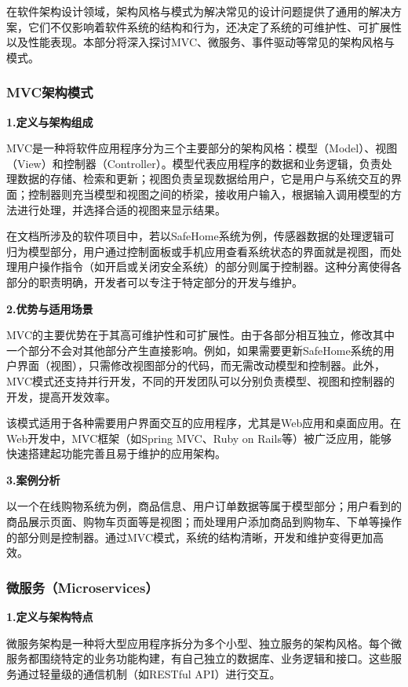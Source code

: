 在软件架构设计领域，架构风格与模式为解决常见的设计问题提供了通用的解决方案，它们不仅影响着软件系统的结构和行为，还决定了系统的可维护性、可扩展性以及性能表现。本部分将深入探讨MVC、微服务、事件驱动等常见的架构风格与模式。

\subsubsection{MVC架构模式}

\textbf{1.定义与架构组成}

MVC是一种将软件应用程序分为三个主要部分的架构风格：模型（Model）、视图（View）和控制器（Controller）。模型代表应用程序的数据和业务逻辑，负责处理数据的存储、检索和更新；视图负责呈现数据给用户，它是用户与系统交互的界面；控制器则充当模型和视图之间的桥梁，接收用户输入，根据输入调用模型的方法进行处理，并选择合适的视图来显示结果。

在文档所涉及的软件项目中，若以SafeHome系统为例，传感器数据的处理逻辑可归为模型部分，用户通过控制面板或手机应用查看系统状态的界面就是视图，而处理用户操作指令（如开启或关闭安全系统）的部分则属于控制器。这种分离使得各部分的职责明确，开发者可以专注于特定部分的开发与维护。

\textbf{2.优势与适用场景}

MVC的主要优势在于其高可维护性和可扩展性。由于各部分相互独立，修改其中一个部分不会对其他部分产生直接影响。例如，如果需要更新SafeHome系统的用户界面（视图），只需修改视图部分的代码，而无需改动模型和控制器。此外，MVC模式还支持并行开发，不同的开发团队可以分别负责模型、视图和控制器的开发，提高开发效率。

该模式适用于各种需要用户界面交互的应用程序，尤其是Web应用和桌面应用。在Web开发中，MVC框架（如Spring MVC、Ruby on Rails等）被广泛应用，能够快速搭建起功能完善且易于维护的应用架构。

\textbf{3.案例分析}

以一个在线购物系统为例，商品信息、用户订单数据等属于模型部分；用户看到的商品展示页面、购物车页面等是视图；而处理用户添加商品到购物车、下单等操作的部分则是控制器。通过MVC模式，系统的结构清晰，开发和维护变得更加高效。

\subsubsection{微服务（Microservices）}

\textbf{1.定义与架构特点}

微服务架构是一种将大型应用程序拆分为多个小型、独立服务的架构风格。每个微服务都围绕特定的业务功能构建，有自己独立的数据库、业务逻辑和接口。这些服务通过轻量级的通信机制（如RESTful API）进行交互。

